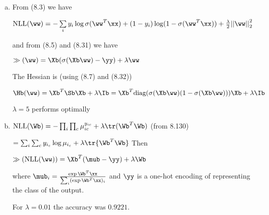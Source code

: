 \documentclass[12pt,letterpaper,fleqn]{hmcpset}
\begin{document}
\begin{solution}
\begin{enumerate}[(a)]
    \item 
        From (8.3) we have

        $\text{NLL}(\ww) = -\sum\limits_{i} y_i \log \sigma(\ww^T \xx) + (1-y_i) \log (1 - \sigma(\ww^T \xx)) + \frac{\lambda}{2} {|| \ww ||}_2^2$

        and from (8.5) and (8.31) we have

        $\gg(\ww) = \Xb (\sigma(\Xb \ww) - \yy) + \lambda \ww$

        The Hessian is (using (8.7) and (8.32))

        $\Hb(\ww) = \Xb^T \Sb \Xb + \lambda \Ib = \Xb^T \text{diag} (\sigma(\Xb \ww) (1 - \sigma(\Xb \ww))) \Xb + \lambda \Ib$

        $\lambda = 5$ performs optimally
    \item 
        $\text{NLL}(\Wb) = -\prod_i \prod_c \mu_{ic}^{y_{ic}} + \lambda \tr (\Wb^T \Wb)$ (from 8.130) 

        $ = \sum_{i} \sum_c y_{i_c} \log \mu_{i_c} + \lambda \tr{\Wb^T \Wb}$
        Then 

        $\gg(\text{NLL}(\ww)) = \Xb^T (\mub - \yy) + \lambda \Wb$

    where $\mub_i = \frac{\exp \Wb^T \xx}{\sum_i (\exp \Wb^T \xx)_i}$ and $\yy$ is a one-hot encoding of representing the class of the output.

        For $\lambda = 0.01$ the accuracy was $0.9221$.
        
    \end{enumerate}
\end{solution}
\newpage
\end{document}
